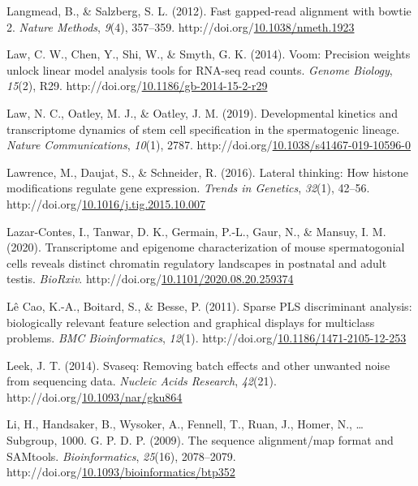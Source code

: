 \documentclass[12pt,twoside]{reedthesis}
\newlength{\cslhangindent}
\newenvironment{CSLReferences}[2] %
 {%
  \setlength{\parindent}{0pt}
  \ifodd #1 \everypar{\setlength{\hangindent}{\cslhangindent}}\ignorespaces\fi
  \ifnum #2 > 0
  \setlength{\parskip}{#2\baselineskip}
  \fi
 }%
 {}
\begin{document}
\begin{CSLReferences}{1}{0}
\leavevmode{}%
Langmead, B., \& Salzberg, S. L. (2012). Fast gapped-read alignment with bowtie 2. \emph{Nature Methods}, \emph{9}(4), 357--359. http://doi.org/\href{https://doi.org/10.1038/nmeth.1923}{10.1038/nmeth.1923}

\leavevmode{}%
Law, C. W., Chen, Y., Shi, W., \& Smyth, G. K. (2014). Voom: Precision weights unlock linear model analysis tools for RNA-seq read counts. \emph{Genome Biology}, \emph{15}(2), R29. http://doi.org/\href{https://doi.org/10.1186/gb-2014-15-2-r29}{10.1186/gb-2014-15-2-r29}

\leavevmode{}%
Law, N. C., Oatley, M. J., \& Oatley, J. M. (2019). Developmental kinetics and transcriptome dynamics of stem cell specification in the spermatogenic lineage. \emph{Nature Communications}, \emph{10}(1), 2787. http://doi.org/\href{https://doi.org/10.1038/s41467-019-10596-0}{10.1038/s41467-019-10596-0}

\leavevmode{}%
Lawrence, M., Daujat, S., \& Schneider, R. (2016). Lateral thinking: How histone modifications regulate gene expression. \emph{Trends in Genetics}, \emph{32}(1), 42--56. http://doi.org/\href{https://doi.org/10.1016/j.tig.2015.10.007}{10.1016/j.tig.2015.10.007}

\leavevmode{}%
Lazar-Contes, I., Tanwar, D. K., Germain, P.-L., Gaur, N., \& Mansuy, I. M. (2020). Transcriptome and epigenome characterization of mouse spermatogonial cells reveals distinct chromatin regulatory landscapes in postnatal and adult testis. \emph{BioRxiv}. http://doi.org/\href{https://doi.org/10.1101/2020.08.20.259374}{10.1101/2020.08.20.259374}

\leavevmode{}%
Lê Cao, K.-A., Boitard, S., \& Besse, P. (2011). Sparse PLS discriminant analysis: biologically relevant feature selection and graphical displays for multiclass problems. \emph{BMC Bioinformatics}, \emph{12}(1). http://doi.org/\href{https://doi.org/10.1186/1471-2105-12-253}{10.1186/1471-2105-12-253}

\leavevmode{}%
Leek, J. T. (2014). Svaseq: Removing batch effects and other unwanted noise from sequencing data. \emph{Nucleic Acids Research}, \emph{42}(21). http://doi.org/\href{https://doi.org/10.1093/nar/gku864}{10.1093/nar/gku864}

\leavevmode{}%
Li, H., Handsaker, B., Wysoker, A., Fennell, T., Ruan, J., Homer, N., \ldots{} Subgroup, 1000. G. P. D. P. (2009). The sequence alignment/map format and SAMtools. \emph{Bioinformatics}, \emph{25}(16), 2078--2079. http://doi.org/\href{https://doi.org/10.1093/bioinformatics/btp352}{10.1093/bioinformatics/btp352}


\end{CSLReferences}
\end{document}
